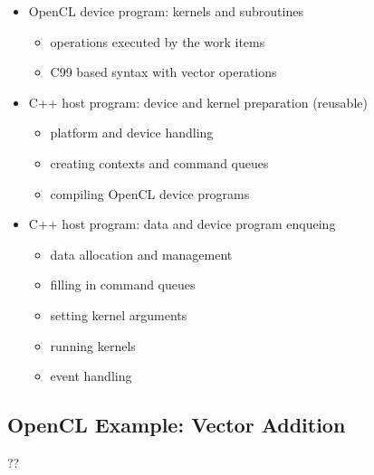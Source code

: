 \begin{itemize}
\tightlist
\item
  OpenCL device program: kernels and subroutines

  \begin{itemize}
  \tightlist
  \item
    operations executed by the work items
  \item
    C99 based syntax with vector operations
  \end{itemize}
\item
  C++ host program: device and kernel preparation (reusable)

  \begin{itemize}
  \tightlist
  \item
    platform and device handling
  \item
    creating contexts and command queues
  \item
    compiling OpenCL device programs
  \end{itemize}
\item
  C++ host program: data and device program enqueing

  \begin{itemize}
  \tightlist
  \item
    data allocation and management
  \item
    filling in command queues
  \item
    setting kernel arguments
  \item
    running kernels
  \item
    event handling
  \end{itemize}
\end{itemize}

\hypertarget{opencl-example-vector-addition}{%
\subsection{OpenCL Example: Vector
Addition}\label{opencl-example-vector-addition}}

??

\clearpage